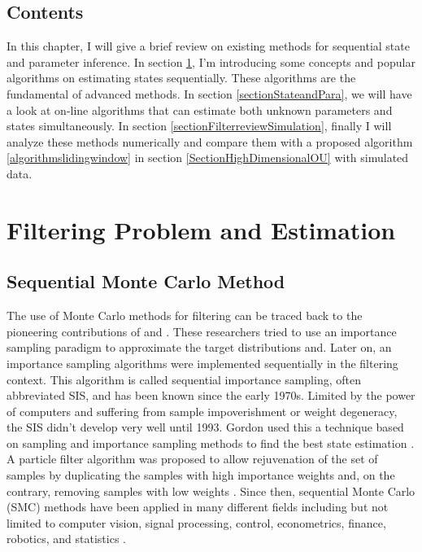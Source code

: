 \subsection*{Contents}

In this chapter, I will give a brief review on existing methods for sequential state and parameter inference. In section \ref{sectionFiltering}, I'm introducing some concepts and popular algorithms on estimating states sequentially. These algorithms are the fundamental of advanced methods. In section \ref{sectionStateandPara}, we will have a look at on-line algorithms that can estimate both unknown parameters and states simultaneously. In section \ref{sectionFilterreviewSimulation}, finally I will analyze these methods numerically and compare them with a proposed algorithm \ref{algorithmslidingwindow} in section \ref{SectionHighDimensionalOU}  with simulated data. 




\section{Filtering Problem and Estimation}\label{sectionFiltering}


\subsection{Sequential Monte Carlo Method}

The use of Monte Carlo methods for filtering can be traced back to the pioneering contributions of  \cite{handschin1969monte} and  \cite{handschin1970monte}. These researchers tried to use an importance sampling paradigm to approximate the target distributions and. Later on, an importance sampling algorithms were implemented sequentially in the filtering context. This algorithm is called sequential importance sampling, often abbreviated SIS, and has been known since the early 1970s. Limited by the power of computers and  suffering from sample impoverishment or weight degeneracy, the SIS didn't develop very well until 1993. Gordon used this a technique based on sampling and importance sampling methods to find the best state estimation  \cite{gordon1993novel}. A particle filter algorithm was proposed to allow rejuvenation of the set of samples by duplicating the samples with high importance weights and, on the contrary, removing samples with low weights \cite{cappe2009inference}. Since then, sequential Monte Carlo (SMC) methods have been applied in many different fields including but not limited to computer vision, signal processing, control, econometrics, finance, robotics, and statistics \cite{smcmip2011}  \cite{ristic2004beyond}.

